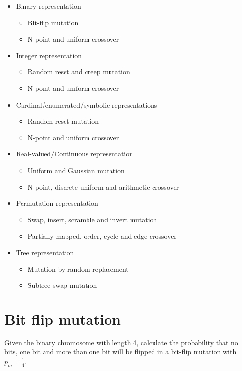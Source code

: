 \begin{itemize}
    \item Binary representation
    \begin{itemize}
        \item Bit-flip mutation
        \item N-point and uniform crossover
    \end{itemize}
    \item Integer representation
    \begin{itemize}
        \item Random reset and creep mutation
        \item N-point and uniform crossover
    \end{itemize}
    \item Cardinal/enumerated/symbolic representations
    \begin{itemize}
        \item Random reset mutation
        \item N-point and uniform crossover
    \end{itemize}
    \item Real-valued/Continuous representation
    \begin{itemize}
        \item Uniform and Gaussian mutation
        \item N-point, discrete uniform and arithmetic crossover
    \end{itemize}
    \item Permutation representation
    \begin{itemize}
        \item Swap, insert, scramble and invert mutation
        \item Partially mapped, order, cycle and edge crossover
    \end{itemize}
    \item Tree representation
    \begin{itemize}
        \item Mutation by random replacement
        \item Subtree swap mutation
    \end{itemize}
\end{itemize}

\section{Bit flip mutation}
Given the binary chromosome with length 4, calculate the probability that no bits,
one bit and more than one bit will be flipped in a bit-flip mutation with \(p_m = \frac{1}{4}\).\\

